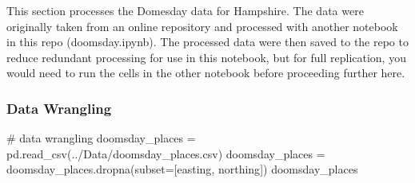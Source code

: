 \documentclass[
  11pt,
  letterpaper,
  DIV=11,
  numbers=noendperiod]{scrartcl}
\newenvironment{Shaded}{\begin{snugshade}}{\end{snugshade}}
\newcommand{\CommentTok}[1]{\textcolor[rgb]{0.37,0.37,0.37}{#1}}
\newcommand{\NormalTok}[1]{\textcolor[rgb]{0.00,0.23,0.31}{#1}}
\newcommand{\OperatorTok}[1]{\textcolor[rgb]{0.37,0.37,0.37}{#1}}
\newcommand{\StringTok}[1]{\textcolor[rgb]{0.13,0.47,0.30}{#1}}
\begin{document}
This section processes the Domesday data for Hampshire. The data were
originally taken from an online repository and processed with another
notebook in this repo (doomsday.ipynb). The processed data were then
saved to the repo to reduce redundant processing for use in this
notebook, but for full replication, you would need to run the cells in
the other notebook before proceeding further here.

\subsubsection{Data Wrangling}\label{data-wrangling-1}

\begin{Shaded}
\begin{Highlighting}[]
\CommentTok{\# data wrangling}
\NormalTok{doomsday\_places }\OperatorTok{=}\NormalTok{ pd.read\_csv(}\StringTok{\textquotesingle{}../Data/doomsday\_places.csv\textquotesingle{}}\NormalTok{)}
\NormalTok{doomsday\_places }\OperatorTok{=}\NormalTok{ doomsday\_places.dropna(subset}\OperatorTok{=}\NormalTok{[}\StringTok{\textquotesingle{}easting\textquotesingle{}}\NormalTok{, }\StringTok{\textquotesingle{}northing\textquotesingle{}}\NormalTok{])}
\NormalTok{doomsday\_places}
\end{Highlighting}
\end{Shaded}
\end{document}
